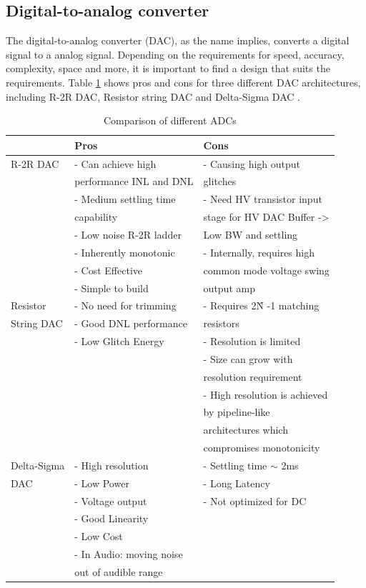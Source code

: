\documentclass[english, 12pt, a4paper]{ifimaster}
\begin{document}
\subsection{Digital-to-analog converter}
The digital-to-analog converter (DAC), as the name implies, converts a digital signal to a analog signal. Depending on the requirements for speed, accuracy, complexity, space and more, it is 
important to find a design that suits the requirements. Table \ref{dac:comparison} shows pros and cons for three different DAC architectures, including R-2R DAC, Resistor string DAC and 
Delta-Sigma DAC \cite{different-dac}. 
\begin{table}[!ht]
  \centering
 \begin{tabular}{|l|l|l|}
 \hline
			& Pros       			& Cons   			\\ \hline
R-2R DAC 		& - Can achieve high		& - Causing high output 	\\
			& performance INL and DNL	& glitches		   	\\ 
			& - Medium settling time	& - Need HV transistor input	\\
			& capability			&  stage for HV DAC Buffer ->	\\
			& - Low noise R-2R ladder	&  Low BW and settling		\\
			& - Inherently monotonic	& - Internally, requires high 	\\
			& - Cost Effective		& common mode voltage swing 	\\
			& - Simple to build 		& output amp		 	\\ \hline
Resistor		& - No need for trimming	& - Requires 2\^N -1 matching 	\\
String DAC		& - Good DNL performance	& resistors			\\
			& - Low Glitch Energy		& - Resolution is limited	\\ 
			& 				& - Size can grow with 		\\
			&				& resolution requirement	\\
			& 				& - High resolution is achieved \\
			&				& by pipeline-like		\\
			& 				& architectures which 		\\
			&				& compromises monotonicity	\\ \hline
Delta-Sigma		& - High resolution		& - Settling time \(\sim\) 2ms	\\
DAC			& - Low Power			& - Long Latency		\\
			& - Voltage output		& -  Not optimized for DC	\\
			& - Good Linearity		&				\\
			& - Low Cost			&				\\
			& - In Audio: moving noise	&				\\
			& out of audible range		&				\\ \hline
 \end{tabular}
 \caption{Comparison of different ADCs}
 \label{dac:comparison}
 \end{table}
\end{document}

